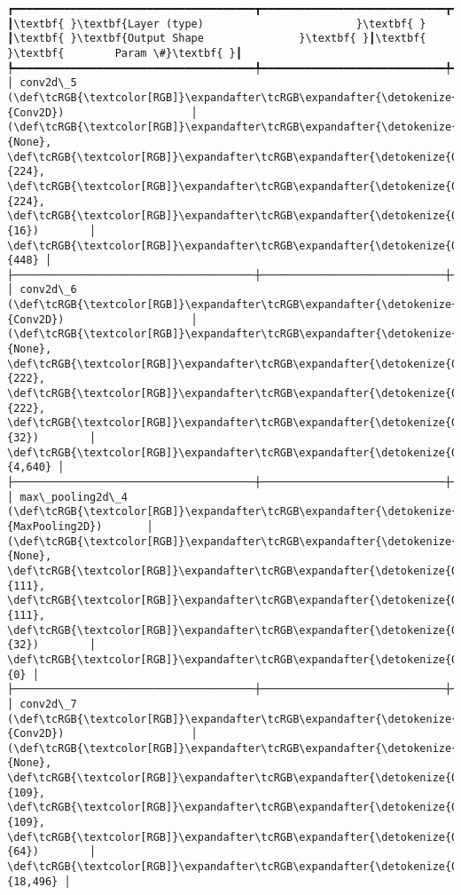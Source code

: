 \documentclass[11pt]{article}
\begin{document}
    \begin{Verbatim}[commandchars=\\\{\}]
┏━━━━━━━━━━━━━━━━━━━━━━━━━━━━━━━━━━━━━━┳━━━━━━━━━━━━━━━━━━━━━━━━━━━━━┳━━━━━━━━━━━━━━━━━┓
┃\textbf{ }\textbf{Layer (type)                        }\textbf{ }┃\textbf{ }\textbf{Output Shape               }\textbf{ }┃\textbf{ }\textbf{        Param \#}\textbf{ }┃
┡━━━━━━━━━━━━━━━━━━━━━━━━━━━━━━━━━━━━━━╇━━━━━━━━━━━━━━━━━━━━━━━━━━━━━╇━━━━━━━━━━━━━━━━━┩
│ conv2d\_5 (\def\tcRGB{\textcolor[RGB]}\expandafter\tcRGB\expandafter{\detokenize{0,135,255}}{Conv2D})                    │ (\def\tcRGB{\textcolor[RGB]}\expandafter\tcRGB\expandafter{\detokenize{0,215,255}}{None}, \def\tcRGB{\textcolor[RGB]}\expandafter\tcRGB\expandafter{\detokenize{0,175,0}}{224}, \def\tcRGB{\textcolor[RGB]}\expandafter\tcRGB\expandafter{\detokenize{0,175,0}}{224}, \def\tcRGB{\textcolor[RGB]}\expandafter\tcRGB\expandafter{\detokenize{0,175,0}}{16})        │             \def\tcRGB{\textcolor[RGB]}\expandafter\tcRGB\expandafter{\detokenize{0,175,0}}{448} │
├──────────────────────────────────────┼─────────────────────────────┼─────────────────┤
│ conv2d\_6 (\def\tcRGB{\textcolor[RGB]}\expandafter\tcRGB\expandafter{\detokenize{0,135,255}}{Conv2D})                    │ (\def\tcRGB{\textcolor[RGB]}\expandafter\tcRGB\expandafter{\detokenize{0,215,255}}{None}, \def\tcRGB{\textcolor[RGB]}\expandafter\tcRGB\expandafter{\detokenize{0,175,0}}{222}, \def\tcRGB{\textcolor[RGB]}\expandafter\tcRGB\expandafter{\detokenize{0,175,0}}{222}, \def\tcRGB{\textcolor[RGB]}\expandafter\tcRGB\expandafter{\detokenize{0,175,0}}{32})        │           \def\tcRGB{\textcolor[RGB]}\expandafter\tcRGB\expandafter{\detokenize{0,175,0}}{4,640} │
├──────────────────────────────────────┼─────────────────────────────┼─────────────────┤
│ max\_pooling2d\_4 (\def\tcRGB{\textcolor[RGB]}\expandafter\tcRGB\expandafter{\detokenize{0,135,255}}{MaxPooling2D})       │ (\def\tcRGB{\textcolor[RGB]}\expandafter\tcRGB\expandafter{\detokenize{0,215,255}}{None}, \def\tcRGB{\textcolor[RGB]}\expandafter\tcRGB\expandafter{\detokenize{0,175,0}}{111}, \def\tcRGB{\textcolor[RGB]}\expandafter\tcRGB\expandafter{\detokenize{0,175,0}}{111}, \def\tcRGB{\textcolor[RGB]}\expandafter\tcRGB\expandafter{\detokenize{0,175,0}}{32})        │               \def\tcRGB{\textcolor[RGB]}\expandafter\tcRGB\expandafter{\detokenize{0,175,0}}{0} │
├──────────────────────────────────────┼─────────────────────────────┼─────────────────┤
│ conv2d\_7 (\def\tcRGB{\textcolor[RGB]}\expandafter\tcRGB\expandafter{\detokenize{0,135,255}}{Conv2D})                    │ (\def\tcRGB{\textcolor[RGB]}\expandafter\tcRGB\expandafter{\detokenize{0,215,255}}{None}, \def\tcRGB{\textcolor[RGB]}\expandafter\tcRGB\expandafter{\detokenize{0,175,0}}{109}, \def\tcRGB{\textcolor[RGB]}\expandafter\tcRGB\expandafter{\detokenize{0,175,0}}{109}, \def\tcRGB{\textcolor[RGB]}\expandafter\tcRGB\expandafter{\detokenize{0,175,0}}{64})        │          \def\tcRGB{\textcolor[RGB]}\expandafter\tcRGB\expandafter{\detokenize{0,175,0}}{18,496} │

\end{Verbatim}
\end{document}
